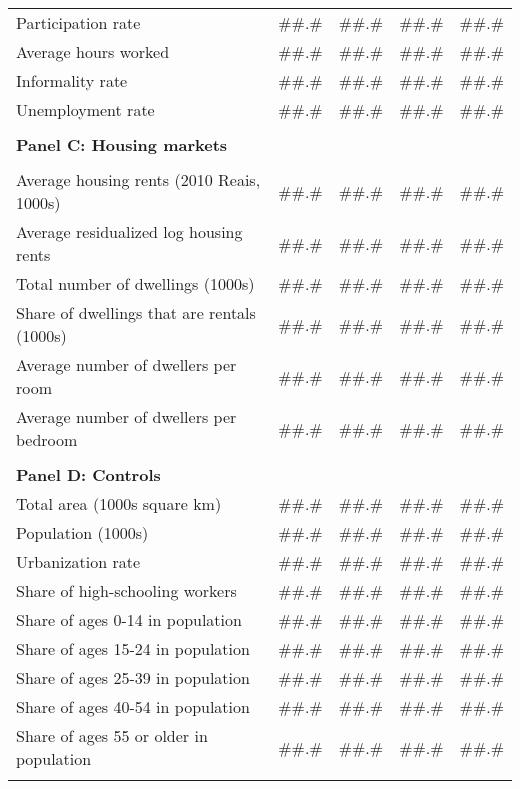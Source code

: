 \begin{tabular}{rcccc}
\multicolumn{1}{l}{Participation rate} & \#\#.\# & \#\#.\# & \#\#.\# & \#\#.\# \\
\multicolumn{1}{l}{Average hours worked} & \#\#.\# & \#\#.\# & \#\#.\# & \#\#.\# \\
\multicolumn{1}{l}{Informality rate} & \#\#.\# & \#\#.\# & \#\#.\# & \#\#.\# \\
\multicolumn{1}{l}{Unemployment rate} & \#\#.\# & \#\#.\# & \#\#.\# & \#\#.\# \\
      &       &       &       &  \\
\multicolumn{1}{l}{\textbf{Panel C: Housing markets}} &       &       &       &  \\
      &       &       &       &  \\
\multicolumn{1}{l}{Average housing rents (2010 Reais, 1000s)} & \#\#.\# & \#\#.\# & \#\#.\# & \#\#.\# \\
\multicolumn{1}{l}{Average residualized log housing rents} & \#\#.\# & \#\#.\# & \#\#.\# & \#\#.\# \\
\multicolumn{1}{l}{Total number of dwellings (1000s)} & \#\#.\# & \#\#.\# & \#\#.\# & \#\#.\# \\
\multicolumn{1}{l}{Share of dwellings that are rentals (1000s)} & \#\#.\# & \#\#.\# & \#\#.\# & \#\#.\# \\
\multicolumn{1}{l}{Average number of dwellers per room} & \#\#.\# & \#\#.\# & \#\#.\# & \#\#.\# \\
\multicolumn{1}{l}{Average number of dwellers per bedroom} & \#\#.\# & \#\#.\# & \#\#.\# & \#\#.\# \\
      &       &       &       &  \\
\multicolumn{1}{l}{\textbf{Panel D: Controls}} &       &       &       &  \\
\multicolumn{1}{l}{Total area (1000s square km)} & \#\#.\# & \#\#.\# & \#\#.\# & \#\#.\# \\
\multicolumn{1}{l}{Population (1000s)} & \#\#.\# & \#\#.\# & \#\#.\# & \#\#.\# \\
\multicolumn{1}{l}{Urbanization rate} & \#\#.\# & \#\#.\# & \#\#.\# & \#\#.\# \\
\multicolumn{1}{l}{Share of high-schooling workers} & \#\#.\# & \#\#.\# & \#\#.\# & \#\#.\# \\
\multicolumn{1}{l}{Share of ages 0-14 in population} & \#\#.\# & \#\#.\# & \#\#.\# & \#\#.\# \\
\multicolumn{1}{l}{Share of ages 15-24 in population} & \#\#.\# & \#\#.\# & \#\#.\# & \#\#.\# \\
\multicolumn{1}{l}{Share of ages 25-39 in population} & \#\#.\# & \#\#.\# & \#\#.\# & \#\#.\# \\
\multicolumn{1}{l}{Share of ages 40-54 in population} & \#\#.\# & \#\#.\# & \#\#.\# & \#\#.\# \\
\multicolumn{1}{l}{Share of ages 55 or older in population} & \#\#.\# & \#\#.\# & \#\#.\# & \#\#.\# \\
      &       &       &       &  \\
\bottomrule
\end{tabular}%

